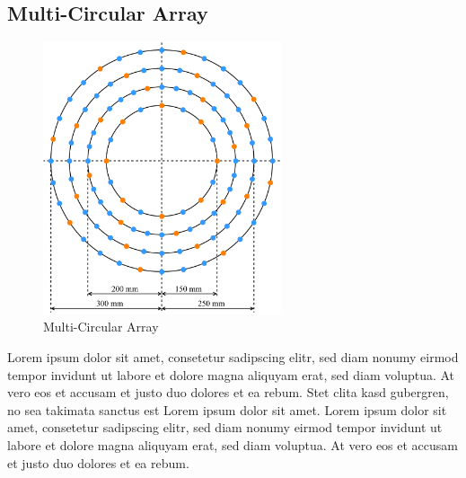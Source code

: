 \subsection{Multi-Circular Array}
\begin{minipage}{\linewidth}
	\begin{figure}
		\vspace{-0.8cm}
		\includegraphics[width=7cm]{images/5_array_evaluation/prototype_array_multi_circular.pdf}
		\centering
		\caption{Multi-Circular Array}
		\label{fig:prototype_array_multi_circular}
	\end{figure}
	Lorem ipsum dolor sit amet, consetetur sadipscing elitr, sed diam nonumy eirmod tempor invidunt ut labore et dolore magna aliquyam erat, sed diam voluptua.
	At vero eos et accusam et justo duo dolores et ea rebum. Stet clita kasd gubergren, no sea takimata sanctus est Lorem ipsum dolor sit amet.
	Lorem ipsum dolor sit amet, consetetur sadipscing elitr, sed diam nonumy eirmod tempor invidunt ut labore et dolore magna aliquyam erat, sed diam voluptua.
	At vero eos et accusam et justo duo dolores et ea rebum.
\end{minipage}
\vspace{0.5cm}    %

